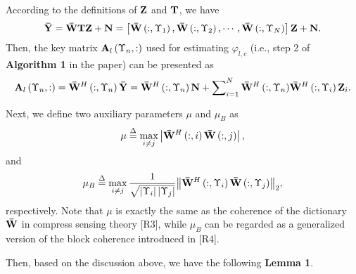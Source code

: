 \documentclass[a4paper,12pt]{article}
\begin{document}
{\begin{framed}
{According to the definitions of ${{\bf{Z}}}$ and ${{\bf{T}}}$, we have
\begin{equation}\label{eq2}
{\bf{\bar Y}} = {\bf{\bar WTZ}} + {\bf{N}} = \left[ {{\bf{\bar W}}\left( {:,{\Upsilon _1}} \right),{\bf{\bar W}}\left( {:,{\Upsilon _2}} \right), \cdots ,{\bf{\bar W}}\left( {:,{\Upsilon _N}} \right)} \right]{\bf{Z}} + {\bf{N}}.
\end{equation}
Then, the key matrix ${{{\bf{A}}_l}\left( {{\Upsilon _n},:} \right)}$ used for estimating ${{\varphi _{l,c}}}$ (i.e., step 2 of \textbf{Algorithm 1} in the paper) can be presented as
\begin{equation}\label{eq3}
{{\bf{A}}_l}\left( {{\Upsilon _n},:} \right) = {{\bf{\bar W}}^H}\left( {:,{\Upsilon _n}} \right){\bf{\bar Y}} = {{\bf{\bar W}}^H}\left( {:,{\Upsilon _n}} \right){\bf{N}} + \sum\nolimits_{i = 1}^N {{{{\bf{\bar W}}}^H}\left( {:,{\Upsilon _n}} \right)} {{\bf{\bar W}}^H}\left( {:,{\Upsilon _i}} \right){{\bf{Z}}_i}.
\end{equation}


Next, we define two auxiliary parameters ${\mu }$ and ${{\mu _B}}$ as
\begin{equation}\label{eq4}
\mu  \buildrel \Delta \over = \mathop {\max }\limits_{i \ne j} \left| {{{{\bf{\bar W}}}^H}\left( {:,i} \right){\bf{\bar W}}\left( {:,j} \right)} \right|,
\end{equation}
and
\begin{equation}\label{eq5}
{\mu _B} \buildrel \Delta \over = \mathop {\max }\limits_{i \ne j} \frac{1}{{\sqrt {\left| {{\Upsilon _i}} \right|\left| {{\Upsilon _j}} \right|} }}{\left\| {{{{\bf{\bar W}}}^H}\left( {:,{\Upsilon _i}} \right){\bf{\bar W}}\left( {:,{\Upsilon _j}} \right)} \right\|_2},
\end{equation}
respectively. Note that ${\mu }$ is exactly the same as the coherence of the dictionary ${{\bf{\bar W}}}$ in compress sensing theory [R3], while ${{\mu _B}}$ can be regarded as a generalized version of the block coherence introduced in [R4].

Then, based on the discussion above, we have the following \textbf{Lemma 1}.

}
\end{framed}}
\end{document}

